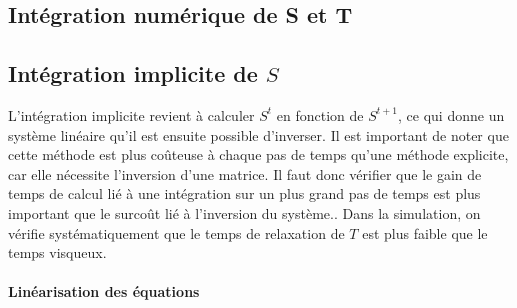 \subsection{Intégration numérique de S et T}\subsection{Intégration implicite de $S$}
\label{ssec:integration_S_imp}
L'intégration implicite revient à calculer $S^t$ en fonction de $S^{t+1}$, ce qui donne un système linéaire qu'il est ensuite possible d'inverser. Il est important de noter que cette méthode est plus coûteuse à chaque pas de temps qu'une méthode explicite, car elle nécessite l'inversion d'une matrice. Il faut donc vérifier que le gain de temps de calcul lié à une intégration sur un plus grand pas de temps est plus important que le surcoût lié à l'inversion du système.. Dans la simulation, on vérifie systématiquement que le temps de relaxation de $T$ est plus faible que le temps visqueux.

\paragraph{Linéarisation des équations}

